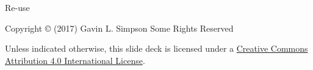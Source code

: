 \documentclass[10pt,ignorenonframetext,compress, aspectratio=169]{beamer}
\begin{document}
\begin{frame}{Re-use}

Copyright © (2017) Gavin L. Simpson Some Rights Reserved

Unless indicated otherwise, this slide deck is licensed under a
\href{http://creativecommons.org/licenses/by/4.0/}{Creative Commons
Attribution 4.0 International License}.

\begin{center}
  \ccby
\end{center}

\end{frame}
\end{document}
